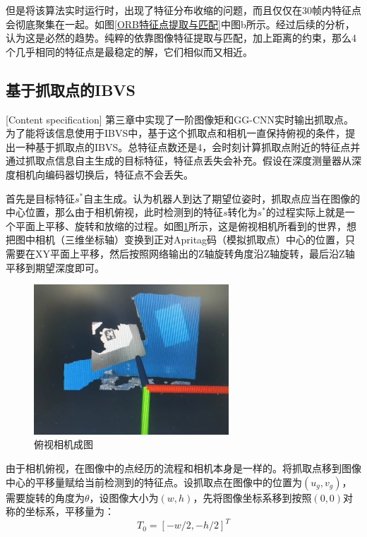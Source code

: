 \documentclass[fontset=fandol,type=bachelor,campus=harbin,bsmainpagenumberline=true]{hithesisbook}
\begin{document}
但是将该算法实时运行时，出现了特征分布收缩的问题，而且仅仅在30帧内特征点会彻底聚集在一起。如图\ref{ORB特征点提取与匹配}中图b所示。经过后续的分析，认为这是必然的趋势。纯粹的依靠图像特征提取与匹配，加上距离的约束，那么4个几乎相同的特征点是最稳定的解，它们相似而又相近。
\subsection{基于抓取点的IBVS}[Content specification]
第三章中实现了一阶图像矩和GG-CNN实时输出抓取点。为了能将该信息使用于IBVS中，基于这个抓取点和相机一直保持俯视的条件，提出一种基于抓取点的IBVS。总特征点数还是4，会时刻计算抓取点附近的特征点并通过抓取点信息自主生成的目标特征，特征点丢失会补充。假设在深度测量器从深度相机向编码器切换后，特征点不会丢失。


首先是目标特征$s^*$自主生成。认为机器人到达了期望位姿时，抓取点应当在图像的中心位置，那么由于相机俯视，此时检测到的特征$s$转化为$s^*$的过程实际上就是一个平面上平移、旋转和放缩的过程。如图\ref{俯视相机成图}所示，这是俯视相机所看到的世界，想把图中相机（三维坐标轴）变换到正对Apritag码（模拟抓取点）中心的位置，只需要在XY平面上平移，然后按照网络输出的Z轴旋转角度沿Z轴旋转，最后沿Z轴平移到期望深度即可。
\begin{figure}[h]
\centering
\includegraphics[width = 0.65\textwidth]{chapter4/俯视相机成图}
\caption{俯视相机成图}
\label{俯视相机成图}
\end{figure}


由于相机俯视，在图像中的点经历的流程和相机本身是一样的。将抓取点移到图像中心的平移量赋给当前检测到的特征点。设抓取点在图像中的位置为$\left( u_g,v_g \right)$，需要旋转的角度为$\theta$，设图像大小为$\left( w,h \right)$，先将图像坐标系移到按照$\left( 0,0 \right)$对称的坐标系，平移量为：
\begin{equation}
T_0=\left[ -w/2,-h/2 \right] ^T
\label{目标特征转化平移量}
\end{equation}
\end{document}
